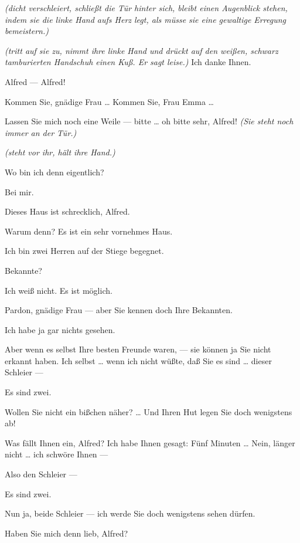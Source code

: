 \documentclass[
	final,
	a4paper,
	ngerman,
	mpinclude = true, %
	twoside = true,
	open = right,
	cleardoublepage = plain,
	DIV = 13,
	BCOR = 1cm,
	titlepage = firstiscover,
	]{scrbook}
\newcommand{\direction}[1]{\textit{(#1)}}
\newcommand{\thecharacter}[1]{\textup{\textsc{#1}}\xspace}
\newcommand{\theherr}{\thecharacter{Junger Herr}}
\newcommand{\thefrau}{\thecharacter{Junge Frau}}
\newcommand{\character}[1]{\item[#1:]}
\newcommand{\herr}{\character{\theherr}}
\newcommand{\frau}{\character{\thefrau}}
\begin{document}
\begin{play}

	\frau
	\direction{dicht verschleiert, schließt die Tür hinter sich, bleibt einen Augenblick stehen, indem sie die linke Hand aufs Herz legt, als müsse sie eine gewaltige Erregung bemeistern.}

	\herr
	\direction{tritt auf sie zu, nimmt ihre linke Hand und drückt auf den weißen, schwarz tamburierten Handschuh einen Kuß. Er sagt leise.} Ich danke Ihnen.

	\frau
	Alfred --- Alfred!

	\herr
	Kommen Sie, gnädige Frau \ldots{} Kommen Sie, Frau Emma \ldots{}

	\frau
	Lassen Sie mich noch eine Weile --- bitte \ldots{} oh bitte sehr, Alfred! \direction{Sie steht noch immer an der Tür.}

	\herr
	\direction{steht vor ihr, hält ihre Hand.}

	\frau
	Wo bin ich denn eigentlich?

	\herr
	Bei mir.

	\frau
	Dieses Haus ist schrecklich, Alfred.

	\herr
	Warum denn? Es ist ein sehr vornehmes Haus.

	\frau
	Ich bin zwei Herren auf der Stiege begegnet.

	\herr
	Bekannte?

	\frau
	Ich weiß nicht. Es ist möglich.

	\herr
	Pardon, gnädige Frau --- aber Sie kennen doch Ihre Bekannten.

	\frau
	Ich habe ja gar nichts gesehen.

	\herr
	Aber wenn es selbst Ihre besten Freunde waren, --- sie können ja Sie nicht erkannt haben. Ich selbst \ldots{} wenn ich nicht wüßte, daß Sie es sind \ldots{} dieser Schleier ---

	\frau
	Es sind zwei.

	\herr
	Wollen Sie nicht ein bißchen näher? \ldots{} Und Ihren Hut legen Sie doch wenigstens ab!

	\frau
	Was fällt Ihnen ein, Alfred? Ich habe Ihnen gesagt: Fünf Minuten \ldots{} Nein, länger nicht \ldots{} ich schwöre Ihnen ---

	\herr
	Also den Schleier ---

	\frau
	Es sind zwei.

	\herr
	Nun ja, beide Schleier --- ich werde Sie doch wenigstens sehen dürfen.

	\frau
	Haben Sie mich denn lieb, Alfred?


\end{play}
\end{document}
